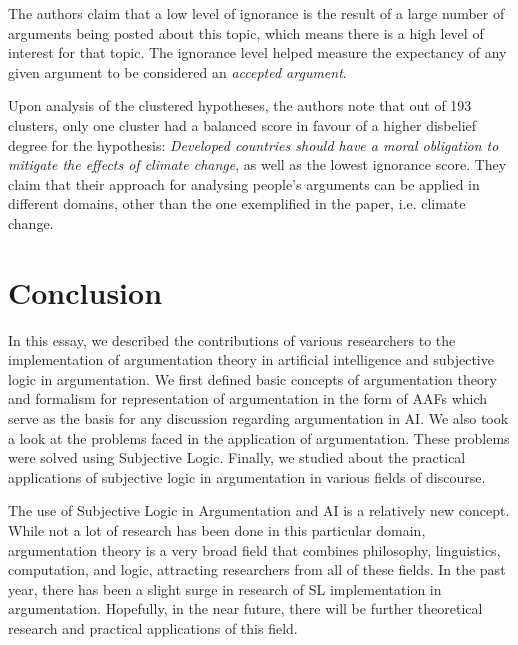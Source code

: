 \documentclass[sigconf]{acmart}
\begin{document}
The authors claim that a low level of ignorance is the result of a large number of arguments being posted about this topic, which means there is a high level of interest for that topic. 
The ignorance level helped measure the expectancy of any given argument to be considered an \textit{accepted argument}.

Upon analysis of the clustered hypotheses, the authors note that out of 193 clusters, only one cluster had a balanced score in favour of a higher disbelief degree for the hypothesis:
 \textit{Developed countries should have a moral obligation to mitigate the effects of climate change}, as well as the lowest ignorance score. They claim that their approach for analysing people's arguments can be applied in different domains, other than the one exemplified in the paper, i.e. climate change.

\section{Conclusion}
In this essay, we described the contributions of various researchers to the implementation of argumentation theory in artificial intelligence and subjective logic in argumentation. We first defined basic concepts of argumentation theory and formalism for representation of argumentation in the form of AAFs which serve as the basis for any discussion regarding argumentation in AI. 
We also took a look at the problems faced in the application of argumentation. These problems were solved using Subjective Logic. Finally, we studied about the practical applications of subjective logic in argumentation in various fields of discourse.

The use of Subjective Logic in Argumentation and AI is a relatively new concept. While not a lot of research has been done in this particular domain, argumentation theory is a very broad field that combines philosophy, linguistics, computation, and logic, attracting researchers from all of these fields. In the past year, there has been a slight surge in research of SL implementation in argumentation. Hopefully, in the near future, there will be further theoretical research and practical applications of this field. 


\end{document}
